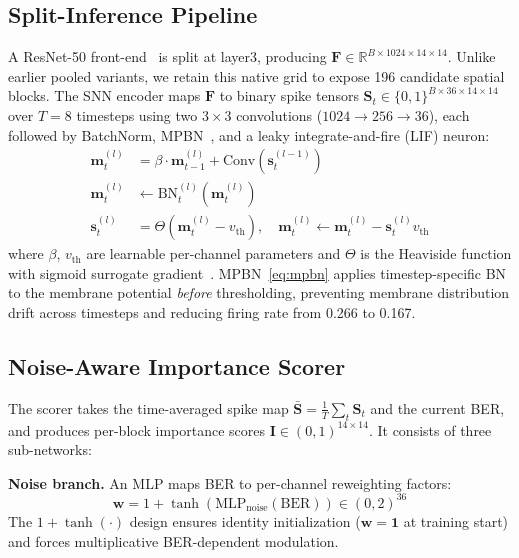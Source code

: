 \documentclass[conference]{IEEEtran}
\begin{document}
\subsection{Split-Inference Pipeline}

A ResNet-50 front-end~\cite{he2016deep} is split at layer3, producing $\mathbf{F}\in\mathbb{R}^{B\times 1024\times14\times14}$. Unlike earlier pooled variants, we retain this native grid to expose 196 candidate spatial blocks. The SNN encoder maps $\mathbf{F}$ to binary spike tensors $\mathbf{S}_t\in\{0,1\}^{B\times36\times14\times14}$ over $T=8$ timesteps using two $3{\times}3$ convolutions ($1024{\to}256{\to}36$), each followed by BatchNorm, MPBN~\cite{guo2023mpbn}, and a leaky integrate-and-fire (LIF) neuron:
\begin{align}
    \mathbf{m}_t^{(l)} &= \beta \cdot \mathbf{m}_{t-1}^{(l)} + \mathrm{Conv}(\mathbf{s}_t^{(l-1)}) \label{eq:membrane}\\
    \mathbf{m}_t^{(l)} &\leftarrow \mathrm{BN}_t^{(l)}(\mathbf{m}_t^{(l)}) \label{eq:mpbn}\\
    \mathbf{s}_t^{(l)} &= \Theta\!\left(\mathbf{m}_t^{(l)}-v_{\text{th}}\right),\quad
    \mathbf{m}_t^{(l)} \leftarrow \mathbf{m}_t^{(l)}-\mathbf{s}_t^{(l)}v_{\text{th}} \label{eq:spike}
\end{align}
where $\beta$, $v_{\text{th}}$ are learnable per-channel parameters and $\Theta$ is the Heaviside function with sigmoid surrogate gradient~\cite{neftci2019surrogate}. MPBN~\eqref{eq:mpbn} applies timestep-specific BN to the membrane potential \emph{before} thresholding, preventing membrane distribution drift across timesteps and reducing firing rate from 0.266 to 0.167.

\subsection{Noise-Aware Importance Scorer}

The scorer takes the time-averaged spike map $\bar{\mathbf{S}}=\frac{1}{T}\sum_t \mathbf{S}_t$ and the current BER, and produces per-block importance scores $\mathbf{I}\in(0,1)^{14\times14}$. It consists of three sub-networks:

\textbf{Noise branch.} An MLP maps BER to per-channel reweighting factors:
\begin{equation}
    \mathbf{w}=1+\tanh(\mathrm{MLP}_{\text{noise}}(\mathrm{BER})) \in (0,2)^{36}
\end{equation}
The $1+\tanh(\cdot)$ design ensures identity initialization ($\mathbf{w}=\mathbf{1}$ at training start) and forces multiplicative BER-dependent modulation.
\end{document}
